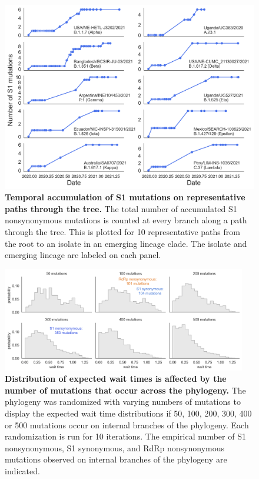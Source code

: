 \documentclass[11pt,oneside,letterpaper]{article}
\begin{document}
\begin{figure}[h!]
	\centerline{\includegraphics[scale=0.55]{fig3_supp1.png}}
	\caption{\textbf{Temporal accumulation of S1 mutations on representative paths through the tree.}
	The total number of accumulated S1 nonsynonymous mutations is counted at every branch along a path through the tree. This is plotted for 10 representative paths from the root to an isolate in an emerging lineage clade. The isolate and emerging lineage are labeled on each panel.
	}
	\label{fig:fig3_supp1}
\end{figure}

\begin{figure}[h!]
	\centerline{\includegraphics[width=0.95\textwidth]{fig3_supp2.png}}
	\caption{\textbf{Distribution of expected wait times is affected by the number of mutations that occur across the phylogeny.}
	The phylogeny was randomized with varying numbers of mutations to display the expected wait time distributions if 50, 100, 200, 300, 400 or 500 mutations occur on internal branches of the phylogeny. Each randomization is run for 10 iterations. The empirical number of S1 nonsynonymous, S1 synonymous, and RdRp nonsynonymous mutations observed on internal branches of the phylogeny are indicated.
	}
	\label{fig:fig3_supp2}
\end{figure}
\end{document}
